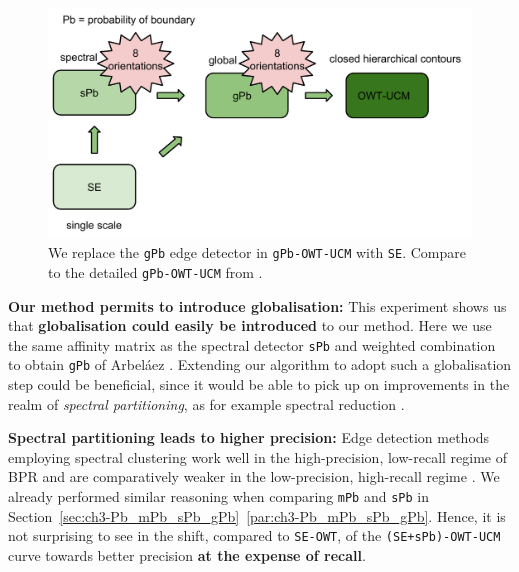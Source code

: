 \begin{figure}[ht!]
\centering
\includegraphics[width=1\textwidth]{images/experiments/SE_sPb-OWT-UCM/SE_sPb-OWT-UCM-details-SE_sPb_gPb.pdf}
\caption[{\tt (SE+sPb)-OWT-UCM} pipeline with focus on the edge-detection stage]{We replace the {\tt gPb} edge detector in {\tt gPb-OWT-UCM} with {\tt SE}. Compare to the detailed {\tt gPb-OWT-UCM} from .}
\label{fig:SE_sPb-OWT-UCM-details-SE_sPb_gPb}
\end{figure}



\textbf{Our method permits to introduce globalisation:} This experiment shows us that {\bf globalisation could easily be introduced} to our method. Here we use the same affinity matrix as the spectral detector {\tt sPb} and weighted combination to obtain {\tt gPb} of Arbel\'aez \etal \cite{Arbelaez11}. Extending our algorithm to adopt such a globalisation step could be beneficial, since it would be able to pick up on improvements in the realm of {\it spectral partitioning}, as for example spectral reduction \cite{Galasso14}. %

\textbf{Spectral partitioning leads to higher precision:} Edge detection methods employing spectral clustering %
work well in the high-precision, low-recall regime of BPR and are comparatively weaker in the low-precision, high-recall regime \cite{Fowlkes04,Yu2005segmentation}. We already performed similar reasoning when comparing {\tt mPb} and {\tt sPb} in Section~\ref*{sec:ch3-Pb_mPb_sPb_gPb}~\ref{par:ch3-Pb_mPb_sPb_gPb}. 
Hence, it is not surprising to see in  the shift, compared to {\tt SE-OWT}, of the {\tt (SE+sPb)-OWT-UCM} curve towards better precision {\bf at the expense of recall}.

